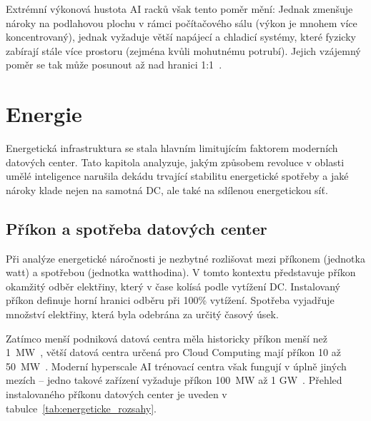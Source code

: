 Extrémní výkonová hustota AI racků však tento poměr mění: Jednak zmenšuje nároky na podlahovou plochu v rámci počítačového sálu (výkon je mnohem více koncentrovaný), jednak vyžaduje větší napájecí a chladicí systémy, které fyzicky zabírají stále více prostoru (zejména kvůli mohutnému potrubí). Jejich vzájemný poměr se tak může posunout až nad hranici 1:1~\cite{butler_unlocking_2025}.

\section{Energie}
\label{sec:energie}


Energetická infrastruktura se stala hlavním limitujícím faktorem moderních datových center. Tato kapitola analyzuje, jakým způsobem revoluce v oblasti umělé inteligence narušila dekádu trvající stabilitu energetické spotřeby a jaké nároky klade nejen na samotná DC, ale také na sdílenou energetickou síť.

\subsection{Příkon a spotřeba datových center}
\label{subsec:prikon}

Při analýze energetické náročnosti je nezbytné rozlišovat mezi příkonem (jednotka watt) a spotřebou (jednotka watthodina). V tomto kontextu představuje příkon okamžitý odběr elektřiny, který v čase kolísá podle vytížení DC. Instalovaný příkon definuje horní hranici odběru při 100\% vytížení. Spotřeba vyjadřuje množství elektřiny, která byla odebrána za určitý časový úsek.

Zatímco menší podniková datová centra měla historicky příkon menší než 1~MW~\cite{barroso_data_2026, sheng_power_2026}, větší datová centra určená pro Cloud Computing mají příkon 10 až 50~MW~\cite[s.~38]{international_energy_agency_iea_energy_2025}. Moderní hyperscale AI trénovací centra však fungují v úplně jiných mezích -- jedno takové zařízení vyžaduje příkon 100~MW až 1 GW~\cite{chen_electricity_2025, sheng_power_2026}. Přehled instalovaného příkonu datových center je uveden v tabulce~\ref{tab:energeticke_rozsahy}.

